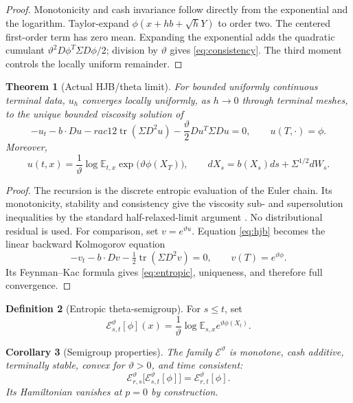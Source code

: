 \documentclass[11pt,reqno]{amsart}
\newtheorem{theorem}{Theorem}[section]
\newtheorem{corollary}[theorem]{Corollary}
\theoremstyle{definition}
\newtheorem{definition}[theorem]{Definition}
\theoremstyle{remark}
\newcommand{\E}{\mathbb E}
\newcommand{\cE}{\mathcal E}
\newcommand{\tr}{\operatorname{tr}}
\begin{document}
\begin{proof}
Monotonicity and cash invariance follow directly from the exponential and the
logarithm.  Taylor-expand $\phi(x+hb+\sqrt hY)$ to order two.  The centered
first-order term has zero mean.  Expanding the exponential adds the quadratic
cumulant $\vartheta^2D\phi^T\Sigma D\phi/2$; division by $\vartheta$ gives
\eqref{eq:consistency}.  The third moment controls the locally uniform
remainder.
\end{proof}

\begin{theorem}[Actual HJB/theta limit]\label{thm:hjb}
For bounded uniformly continuous terminal data, $u_h$ converges locally
uniformly, as $h\to0$ through terminal meshes, to the unique bounded viscosity
solution of
\begin{equation}\label{eq:hjb}
 -u_t-b\cdot Du-rac12\tr(\Sigma D^2u)
 -\frac\vartheta2Du^T\Sigma Du=0,
 \qquad u(T,\cdot)=\phi.
\end{equation}
Moreover,
\begin{equation}\label{eq:entropic}
 u(t,x)=\frac1\vartheta
 \log\E_{t,x}\exp\bigl(\vartheta\phi(X_T)\bigr),
 \qquad
 dX_s=b(X_s)ds+\Sigma^{1/2}dW_s.
\end{equation}
\end{theorem}

\begin{proof}
The recursion is the discrete entropic evaluation of the Euler chain.  Its
monotonicity, stability and consistency give the viscosity sub- and
supersolution inequalities by the standard half-relaxed-limit argument
\cite{BarlesSouganidis1991}.  No distributional residual is used.  For
comparison, set $v=e^{\vartheta u}$.  Equation \eqref{eq:hjb} becomes the
linear backward Kolmogorov equation
\[
 -v_t-b\cdot Dv-\tfrac12\tr(\Sigma D^2v)=0,
 \qquad v(T)=e^{\vartheta\phi}.
\]
Its Feynman--Kac formula gives \eqref{eq:entropic}, uniqueness, and therefore
full convergence.
\end{proof}

\begin{definition}[Entropic theta-semigroup]
For $s\le t$, set
\[
 \cE_{s,t}^{\vartheta}[\phi](x)
 =\frac1\vartheta\log\E_{s,x}
 e^{\vartheta\phi(X_t)}.
\]
\end{definition}

\begin{corollary}[Semigroup properties]\label{cor:theta}
The family $\cE^{\vartheta}$ is monotone, cash additive, terminally stable,
convex for $\vartheta>0$, and time consistent:
\[
 \cE_{r,s}^{\vartheta}
 \bigl[\cE_{s,t}^{\vartheta}[\phi]\bigr]
 =\cE_{r,t}^{\vartheta}[\phi].
\]
Its Hamiltonian vanishes at $p=0$ by construction.
\end{corollary}
\end{document}
